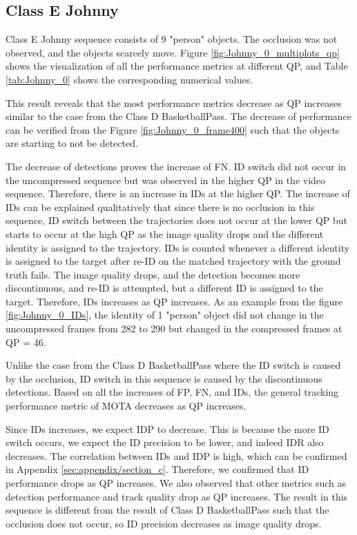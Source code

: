 \subsection{Class E Johnny}
Class E Johnny sequence consists of 9 "person" objects. The occlusion was not observed, and the objects scarcely move. Figure \ref{fig:Johnny_0_multiplots_qp} shows the visualization of all the performance metrics at different QP, and Table \ref{tab:Johnny_0} shows the corresponding numerical values. 


This result reveals that the most performance metrics decrease as QP increases similar to the case from the Class D BasketballPass. The decrease of performance can be verified from the Figure \ref{fig:Johnny_0_frame400} such that the objects are starting to not be detected.

The decrease of detections proves the increase of FN. ID switch did not occur in the uncompressed sequence but was observed in the higher QP in the video sequence. Therefore, there is an increase in IDs at the higher QP. The increase of IDs can be explained qualitatively that since there is no occlusion in this sequence, ID switch between the trajectories does not occur at the lower QP but starts to occur at the high QP as the image quality drops and the different identity is assigned to the trajectory. IDs is counted whenever a different identity is assigned to the target after re-ID on the matched trajectory with the ground truth fails. The image quality drops, and the detection becomes more discontinuous, and re-ID is attempted, but a different ID is assigned to the target. Therefore, IDs increases as QP increases. As an example from the figure \ref{fig:Johnny_0_IDs}, the identity of 1 "person" object did not change in the uncompressed frames from 282 to 290 but changed in the compressed frames at QP = 46.

Unlike the case from the Class D BasketballPass where the ID switch is caused by the occlusion, ID switch in this sequence is caused by the discontinuous detections. Based on all the increases of FP, FN, and IDs, the general tracking performance metric of MOTA decreases as QP increases.

Since IDs increases, we expect IDP to decrease. This is because the more ID switch occurs, we expect the ID precision to be lower, and indeed IDR also decreases. The correlation between IDs and IDP is high, which can be confirmed in Appendix \ref{sec:appendix/section_c}. Therefore, we confirmed that ID performance drops as QP increases. We also observed that other metrics such as detection performance and track quality drop as QP increases. The result in this sequence is different from the result of Class D BasketballPass such that the occlusion does not occur, so ID precision decreases as image quality drops.

